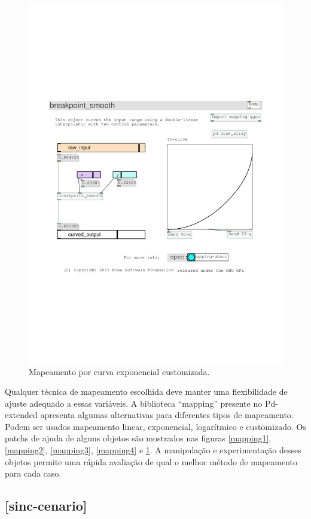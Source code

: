 \documentclass[draft]{ppgmus}
\begin{document}
\begin{figure}
\includegraphics[scale=.6]{mapping5}
\caption{Mapeamento por curva exponencial customizada.}
\label{mapping5}
\end{figure}


Qualquer técnica de mapeamento escolhida deve manter uma flexibilidade
de ajuste adequado a essas variáveis. A biblioteca ``mapping'' presente no
Pd-extended apresenta algumas alternativas para diferentes tipos de mapeamento.
Podem ser usados mapeamento linear, exponencial, logarítmico e customizado.
Os patchs de ajuda de alguns objetos são mostrados nas figuras \ref{mapping1}, \ref{mapping2},
\ref{mapping3}, \ref{mapping4} e \ref{mapping5}.
A manipulação e experimentação desses objetos permite uma rápida avaliação de qual o melhor
método de mapeamento para cada caso.


\subsection{[sinc-cenario]}
\end{document}
